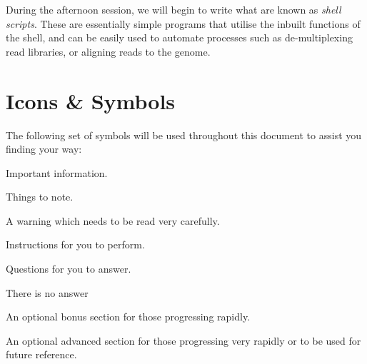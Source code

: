 \documentclass[a4paper,12pt,twoside]{memoir}
\begin{document}
During the afternoon session, we will begin to write what are known as \textit{shell scripts}.
These are essentially simple programs that utilise the inbuilt functions of the shell, and can be easily used to automate processes such as de-multiplexing read libraries, or aligning reads to the genome.


\section{Icons \& Symbols}
The following set of symbols will be used throughout this document to assist you finding your way: \\

\begin{information}
Important information.\\
\end{information}

\begin{note}
Things to note.\\
\end{note}

\begin{warning}
A warning which needs to be read very carefully.\\
\end{warning}

\begin{steps}
Instructions for you to perform. \\
\end{steps}

\begin{questions}
Questions for you to answer. \\
\begin{answer}
There is no answer
\end{answer}
\end{questions}

\begin{bonus}
An optional bonus section for those progressing rapidly. \\
\end{bonus}

\begin{advanced}
An optional advanced section for those progressing very rapidly or to be used for future reference. \\
\end{advanced}
\end{document}

